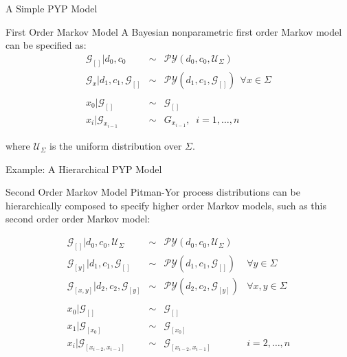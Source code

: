 \documentclass{beamer}
\newcommand{\G}{\mathcal{G}}
\newcommand{\PY}{\mathcal{P}\mathcal{Y}}
\begin{document}
	\begin{frame}[t]{A Simple PYP Model  \cite{Pitman1997}}
	
	\begin{block}{First Order Markov Model}
	A Bayesian nonparametric first order Markov model can be specified as:
	\begin{eqnarray*}
		\G_{[]} | d_0, c_0 &\sim& \PY(d_0, c_0, \mathcal{U}_\Sigma)\\
		\G_x | d_1,c_1, \G_{[]} &\sim& \PY(d_1,c_1,\G_{[]}) \ \ \forall x \in \Sigma \\
		\\
		x_0 | \G_{[]} &\sim& \G_{[]} \\
		x_i | \G_{x_{i-1}} &\sim& G_{x_{i-1}}, \;\; i=1,\ldots,n
	\end{eqnarray*}
	
	where $\mathcal{U}_\Sigma$ is the uniform distribution over $\Sigma$.	
	\end{block}
\end{frame}

\begin{frame}[t]{Example: A Hierarchical PYP Model \cite{teh2006a}}

\begin{block}{Second Order Markov Model}
	Pitman-Yor process distributions can be hierarchically composed to specify higher order Markov models, such as this second order order Markov model:

	\[
	\begin{array}{rcll}
		\G_{[]} | d_0,c_0,\mathcal{U}_\Sigma &\sim& \PY(d_0, c_0, \mathcal{U}_\Sigma)\\
		\G_{[y]} | d_1, c_1, \G_{[]} &\sim& \PY(d_1, c_1, \G_{[]}) & \forall y \in \Sigma \\
		\G_{[x,y]} | d_2, c_2, \G_{[y]} &\sim& \PY(d_2, c_2, \G_{[y]} )& \forall x, y \in \Sigma\\
		\\
		x_0 | \G_{[]} &\sim& \G_{[]} \\
		x_1 | \G_{[x_0]} &\sim& \G_{[x_0]} \\
		x_i | \G_{[x_{i-2}, x_{i-1}]} &\sim& \G_{[x_{i-2}, x_{i-1}]} & i = 2, \ldots, n 
	\end{array}
	\]
	\end{block}
	
\end{frame}
\end{document}
